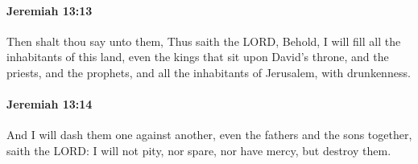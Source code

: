 		\paragraph{Jeremiah 13:13} %
			\label{JEREMIAH-13-13}

			Then shalt thou say unto them, Thus saith the LORD, Behold, I will fill all the inhabitants of this land, even the kings that sit upon David’s throne, and the priests, and the prophets, and all the inhabitants of Jerusalem, with drunkenness.


		\paragraph{Jeremiah 13:14} %
			\label{JEREMIAH-13-14}

			And I will dash them one against another, even the fathers and the sons together, saith the LORD: I will not pity, nor spare, nor have mercy, but destroy them.

